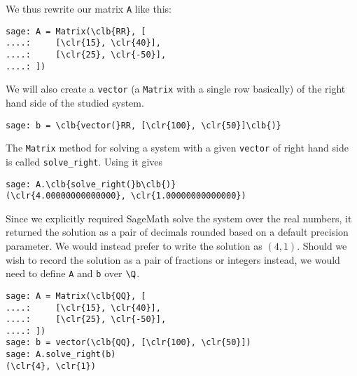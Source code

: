 We thus rewrite our matrix \texttt{A} like this:
\begin{Verbatim}
sage: A = Matrix(\clb{RR}, [
....:     [\clr{15}, \clr{40}],
....:     [\clr{25}, \clr{-50}],
....: ])
\end{Verbatim}
We will also create a \texttt{vector} (a \texttt{Matrix} with a single row
basically) of the right hand side of the studied system.
\begin{Verbatim}
sage: b = \clb{vector(}RR, [\clr{100}, \clr{50}]\clb{)}
\end{Verbatim}
The \texttt{Matrix} method for solving a system with a given \texttt{vector} of
right hand side is called \texttt{solve\_right}. Using it gives
\begin{Verbatim}
sage: A.\clb{solve_right(}b\clb{)}
(\clr{4.00000000000000}, \clr{1.00000000000000})
\end{Verbatim}
Since we explicitly required SageMath solve the system over the real numbers, it
returned the solution as a pair of decimals rounded based on a default precision
parameter. We would instead prefer to write the solution as $(4,1)$. Should we
wish to record the solution as a pair of fractions or integers instead, we would
need to define \texttt{A} and \texttt{b} over $\Q$.
\begin{Verbatim}
sage: A = Matrix(\clb{QQ}, [
....:     [\clr{15}, \clr{40}],
....:     [\clr{25}, \clr{-50}],
....: ])
sage: b = vector(\clb{QQ}, [\clr{100}, \clr{50}])
sage: A.solve_right(b)
(\clr{4}, \clr{1})
\end{Verbatim}


